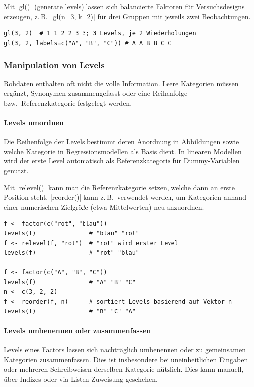 \documentclass[10pt,twocolumn]{scrartcl}
\renewcommand{\lstinline}{\mycoloredinline}
\begin{document}
Mit \lstinline|gl()| (generate levels) lassen sich balancierte Faktoren für Versuchsdesigns erzeugen, z.\,B.\ \lstinline|gl(n=3, k=2)| für drei Gruppen mit jeweils zwei Beobachtungen.

\begin{lstlisting}
gl(3, 2)  # 1 1 2 2 3 3; 3 Levels, je 2 Wiederholungen
gl(3, 2, labels=c("A", "B", "C")) # A A B B C C
\end{lstlisting}


\subsubsection{Manipulation von Levels}

Rohdaten enthalten oft nicht die volle Information. Leere Kategorien müssen ergänzt, Synonymen zusammengefasst oder eine Reihenfolge bzw.\  Referenzkategorie festgelegt werden.

\paragraph{Levels umordnen}

Die Reihenfolge der Levels bestimmt deren Anordnung in Abbildungen sowie welche Kategorie in Regressionsmodellen als Basis dient. In linearen Modellen wird der erste Level automatisch als Referenzkategorie für Dummy-Variablen genutzt.

Mit \lstinline|relevel()| kann man die Referenzkategorie setzen, welche dann an erste Position steht. \lstinline|reorder()| kann z.\,B.\ verwendet werden, um Kategorien anhand einer numerischen Zielgröße (etwa Mittelwerten) neu anzuordnen.

\begin{lstlisting}
f <- factor(c("rot", "blau"))
levels(f)               # "blau" "rot"
f <- relevel(f, "rot")  # "rot" wird erster Level
levels(f)               # "rot" "blau"

f <- factor(c("A", "B", "C"))
levels(f)               # "A" "B" "C"
n <- c(3, 2, 2)
f <- reorder(f, n)      # sortiert Levels basierend auf Vektor n
levels(f)               # "B" "C" "A"
\end{lstlisting}


\paragraph{Levels umbenennen oder zusammenfassen}

Levels eines Factors lassen sich nachträglich umbenennen oder zu gemeinsamen Kategorien zusammenfassen. Dies ist insbesondere bei uneinheitlichen Eingaben oder mehreren Schreibweisen derselben Kategorie nützlich. Dies kann manuell, über Indizes oder via Listen-Zuweisung geschehen.
\end{document}
